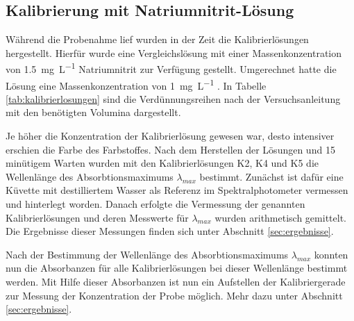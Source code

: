 \subsection*{Kalibrierung mit Natriumnitrit-Lösung}
Während die Probenahme lief wurden in der Zeit die Kalibrierlösungen hergestellt. Hierfür wurde eine Vergleichslösung mit einer Massenkonzentration von \SI{1,5}{\milli \gram \per \liter} Natriumnitrit zur Verfügung gestellt. Umgerechnet hatte die Lösung eine Massenkonzentration von \SI{1}{\milli \gram \per \liter} . In Tabelle \ref{tab:kalibrierlosungen} sind die Verdünnungsreihen nach der Versuchsanleitung mit den benötigten Volumina dargestellt.
\vspace*{-5mm}
\begin{table}[h!]
	\renewcommand*{\arraystretch}{1.2}
	\centering
	\caption{Kalibrierlösungen}
	\label{tab:kalibrierlosungen}
\end{table}%
\FloatBarrier
Je höher die Konzentration der Kalibrierlösung gewesen war, desto intensiver erschien die Farbe des Farbstoffes.
Nach dem Herstellen der Lösungen und 15 minütigem Warten wurden mit den Kalibrierlösungen K2, K4 und K5 die Wellenlänge des Absorbtionsmaximums $\lambda_{max}$ bestimmt. Zunächst ist dafür eine Küvette mit destilliertem Wasser als Referenz im Spektralphotometer vermessen und hinterlegt worden. Danach erfolgte die Vermessung der genannten Kalibrierlösungen und deren Messwerte für $\lambda_{max}$ wurden arithmetisch gemittelt. Die Ergebnisse dieser Messungen finden sich unter Abschnitt \ref{sec:ergebnisse}.

Nach der Bestimmung der Wellenlänge des Absorbtionsmaximums $\lambda_{max}$ konnten nun die Absorbanzen für alle Kalibrierlösungen bei dieser Wellenlänge bestimmt werden. Mit Hilfe dieser Absorbanzen ist nun ein Aufstellen der Kalibriergerade zur Messung der Konzentration der Probe möglich. Mehr dazu unter Abschnitt \ref{sec:ergebnisse}.

